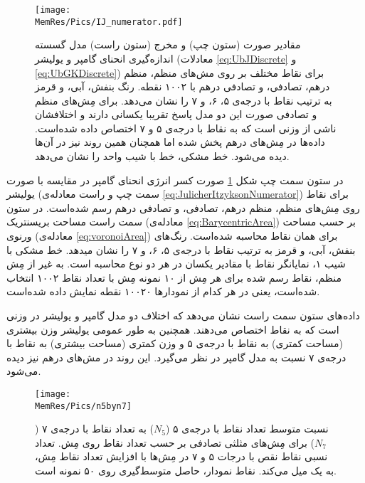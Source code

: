 \begin{figure}[htbp]
\begin{center}
\texttt{[image: \\MemRes/Pics/IJ\_numerator.pdf]}
\caption{
مقادیر صورت (ستون چپ) و مخرج (ستون راست) مدل گسسته اندازه‌گیری انحنای گامپر و یولیشر (معادلات 
\ref{eq:UbJDiscrete}
و
\ref{eq:UbGKDiscrete})
برای نقاط مختلف بر روی مش‌های منظم، منظم درهم، تصادفی، و تصادفی درهم با ۱۰۰۲ نقطه. رنگ بنفش، آبی، و قرمز به ترتیب  نقاط با درجه‌ی ۵، ۶، و ۷ را نشان می‌دهد. برای مِش‌های منظم و تصادفی صورت این دو مدل پاسخ تقریبا یکسانی دارند و اختلافشان ناشی از وزنی است که به نقاط با درجه‌ی ۵ و ۷ اختصاص داده شده‌است. داده‌ها در مِش‌های درهم پخش شده اما همچنان همین روند نیز در آن‌ها دیده می‌شود. خط مشکی، خط با شیب واحد را نشان می‌دهد.
}
\label{fig:unitsphereBendingScatter}
\end{center}
\end{figure}

در ستون سمت چپ شکل 
\ref{fig:unitsphereBendingScatter}
صورت کسر انرژی انحنای گامپر در مقایسه با صورت یولیشر (سمت چپ و راست معادله‌ی 
\ref{eq:JulicherItzyksonNumerator})
 برای نقاط روی مِش‌های منظم، منظم درهم، تصادفی، و تصادفی درهم رسم شده‌است. در ستون سمت راست مساحت بریسنتریک (معادله‌ی 
\ref{eq:BarycentricArea})
 بر حسب مساحت ورنوی (معادله‌ی
\ref{eq:voronoiArea})
 برای همان نقاط محاسبه شده‌است. رنگ‌های بنفش، آبی،‌ و قرمز به ترتیب نقاط با درجه‌ی ۵، ۶، و ۷  را نشان میدهد. خط مشکی با شیب ۱، نمایانگر نقاط با مقادیر یکسان در هر دو نوع محاسبه است. به غیر از مِش منظم،‌ نقاط رسم شده برای هر مِش از ۱۰ نمونه مِش با تعداد نقاط ۱۰۰۲ انتخاب شده‌است، یعنی در هر کدام از نمودارها ۱۰۰۲۰ نقطه نمایش داده شده‌است.

داده‌های ستون سمت راست نشان می‌دهد که اختلاف دو مدل گامپر و یولیشر  در  وزنی است که به نقاط اختصاص می‌دهند. همچنین به طور عمومی یولیشر وزن بیشتری (مساحت کمتری) به نقاط با درجه‌ی ۵ و وزن کمتری (مساحت بیشتری) به نقاط با درجه‌ی ۷ نسبت به مدل گامپر در نظر می‌گیرد. این روند در مش‌های درهم نیز دیده می‌شود.

\begin{figure}[htbp]
\begin{center}
\texttt{[image: \\MemRes/Pics/n5byn7]}
\caption{
نسبت متوسط تعداد نقاط با درجه‌ی ۵ 
($N_5$)
 به تعداد نقاط با درجه‌ی ۷ 
($N_7$)
 برای مِش‌های مثلثی تصادفی بر حسب تعداد نقاط روی مِش. تعداد نسبی نقاط نقص با درجات ۵ و ۷ در مِش‌ها با افزایش تعداد نقاط مِش، به یک میل می‌کند. نقاط نمودار، حاصل متوسط‌گیری روی ۵۰ نمونه است.
}
\label{fig:n5n7}
\end{center}
\end{figure}


